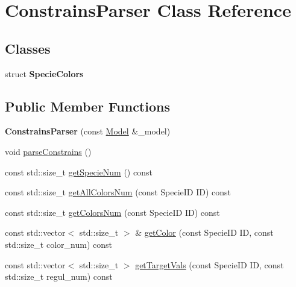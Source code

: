 \hypertarget{class_constrains_parser}{\section{Constrains\-Parser Class Reference}
\label{class_constrains_parser}
}
\subsection*{Classes}
\begin{DoxyCompactItemize}
\item 
struct {\bfseries Specie\-Colors}
\end{DoxyCompactItemize}
\subsection*{Public Member Functions}
\begin{DoxyCompactItemize}
\item 
\hypertarget{class_constrains_parser_ae090c83175384de43b0b359efb3dc99a}{{\bfseries Constrains\-Parser} (const \hyperlink{class_model}{Model} \&\-\_\-model)}\label{class_constrains_parser_ae090c83175384de43b0b359efb3dc99a}

\item 
void \hyperlink{class_constrains_parser_af51ba37879812d01fdbf83153dcd7c0b}{parse\-Constrains} ()
\item 
const std\-::size\-\_\-t \hyperlink{class_constrains_parser_a471dbfd089826d265992b40538062285}{get\-Specie\-Num} () const 
\item 
const std\-::size\-\_\-t \hyperlink{class_constrains_parser_af23e388fa1d01538efc0ae2fd601356c}{get\-All\-Colors\-Num} (const Specie\-I\-D I\-D) const 
\item 
const std\-::size\-\_\-t \hyperlink{class_constrains_parser_a572ab122d8bd328598f62f78e1a40009}{get\-Colors\-Num} (const Specie\-I\-D I\-D) const 
\item 
const std\-::vector$<$ std\-::size\-\_\-t $>$ \& \hyperlink{class_constrains_parser_ab70e1d30731e9b5f10e11a678312d716}{get\-Color} (const Specie\-I\-D I\-D, const std\-::size\-\_\-t color\-\_\-num) const 
\item 
const std\-::vector$<$ std\-::size\-\_\-t $>$ \hyperlink{class_constrains_parser_ae2d87d0022583e6725b6a666cceafcbf}{get\-Target\-Vals} (const Specie\-I\-D I\-D, const std\-::size\-\_\-t regul\-\_\-num) const 
\end{DoxyCompactItemize}


